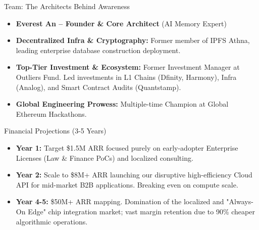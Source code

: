 ﻿\documentclass[aspectratio=169, 10pt]{beamer}
\begin{document}
\begin{frame}{Team: The Architects Behind Awareness}
\begin{itemize}
    \item \textbf{Everest An -- Founder \& Core Architect} (AI Memory Expert)
    \vspace{0.5em}
    \item \textbf{Decentralized Infra \& Cryptography:} Former member of IPFS Athna, leading enterprise database construction deployment.
    \item \textbf{Top-Tier Investment \& Ecosystem:} Former Investment Manager at Outliers Fund. Led investments in L1 Chains (Dfinity, Harmony), Infra (Analog), and Smart Contract Audits (Quantstamp).
    \item \textbf{Global Engineering Prowess:} Multiple-time Champion at Global Ethereum Hackathons.
\end{itemize}
\end{frame}

\begin{frame}{Financial Projections (3-5 Years)}
\begin{itemize}
    \item \textbf{Year 1:} Target \$1.5M ARR focused purely on early-adopter Enterprise Licenses (Law \& Finance PoCs) and localized consulting.
    \item \textbf{Year 2:} Scale to \$8M+ ARR launching our disruptive high-efficiency Cloud API for mid-market B2B applications. Breaking even on compute scale.
    \item \textbf{Year 4-5:} \$50M+ ARR mapping. Domination of the localized and "Always-On Edge" chip integration market; vast margin retention due to 90\% cheaper algorithmic operations.
\end{itemize}
\end{frame}
\end{document}
